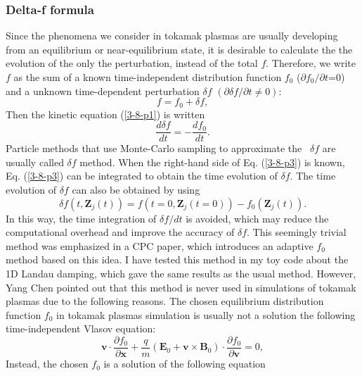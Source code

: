 \documentclass{article}
\begin{document}
\subsubsection{Delta-f formula}

Since the phenomena we consider in tokamak plasmas are usually developing from
an equilibrium or near-equilibrium state, it is desirable to calculate the the
evolution of the only the perturbation, instead of the total $f$. Therefore,
we write $f$ as the sum of a known time-independent distribution function
$f_0$ ($\partial f_0 / \partial t$=0) and a unknown time-dependent
perturbation $\delta f$ $(\partial \delta f / \partial t \neq 0)$:
\begin{equation}
  \label{10-26-e1} f = f_0 + \delta f,
\end{equation}
Then the kinetic equation (\ref{3-8-p1}) is written
\begin{equation}
  \label{3-8-p3} \frac{d \delta f}{d t} = - \frac{d f_0}{d t} .
\end{equation}
Particle methods that use Monte-Carlo sampling to approximate the \ $\delta f$
are usually called $\delta f$ method. When the right-hand side of Eq.
(\ref{3-8-p3}) is known, Eq. (\ref{3-8-p3}) can be integrated to obtain the
time evolution of $\delta f$. The time evolution of $\delta f$ can also be
obtained by using
\begin{equation}
  \label{17-6-12-p9} \delta f (t, \mathbf{Z}_j (t)) = f (t = 0, \mathbf{Z}_j
  (t = 0)) - f_0 (\mathbf{Z}_j (t)) .
\end{equation}
In this way, the time integration of $\delta f / d t$ is avoided, which may
reduce the computational overhead and improve the accuracy of $\delta f$. This
seemingly trivial method was emphasized in a CPC paper{\cite{allfrey2003}},
which introduces an adaptive $f_0$ method based on this idea. I have tested
this method in my toy code about the 1D Landau damping, which gave the same
results as the usual method. However, Yang Chen pointed out that this method
is never used in simulations of tokamak plasmas due to the following reasons.
The chosen equilibrium distribution function $f_0$ in tokamak plasmas
simulation is usually not a solution the following time-independent Vlasov
equation:
\begin{equation}
  \mathbf{v} \cdot \frac{\partial f_0}{\partial \mathbf{x}} + \frac{q}{m}
  (\mathbf{E}_0 +\mathbf{v} \times \mathbf{B}_0) \cdot \frac{\partial
  f_0}{\partial \mathbf{v}} = 0,
\end{equation}
Instead, the chosen $f_0$ is a solution of the following equation
\end{document}
